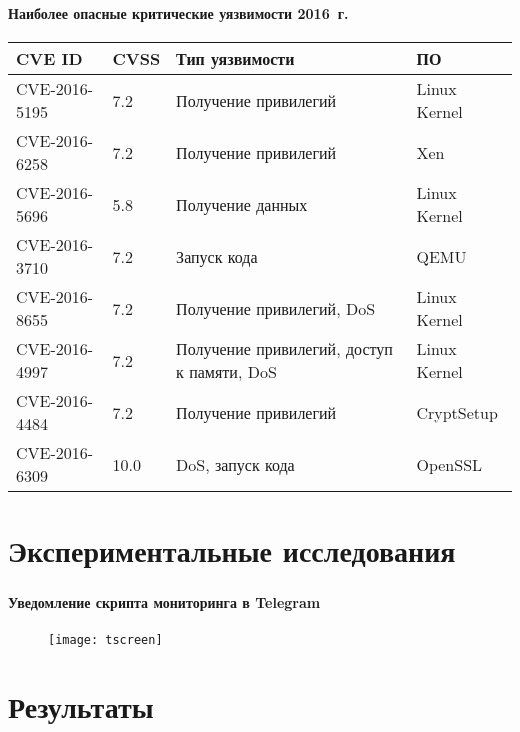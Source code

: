 \begin{frame}
\frametitle{\insertsection}
\framesubtitle{Наиболее опасные критические уязвимости 2016~г.}

\begin{table}[H]
  \begin{tabular}{|l|p{0.8cm}|p{4cm}|l|}
  \hline \textbf{CVE ID} & \textbf{CVSS} & \textbf{Тип уязвимости} & \textbf{ПО} \\
  \hline CVE-2016-5195 & 7.2 & Получение привилегий & Linux Kernel \\
  \hline CVE-2016-6258 & 7.2 & Получение привилегий & Xen \\
  \hline CVE-2016-5696 & 5.8 & Получение данных & Linux Kernel \\
  \hline CVE-2016-3710 & 7.2 & Запуск кода & QEMU \\
  \hline CVE-2016-8655 & 7.2 & Получение привилегий, DoS & Linux Kernel \\
  \hline CVE-2016-4997 & 7.2 & Получение привилегий, доступ к памяти, DoS & Linux Kernel \\
  \hline CVE-2016-4484 & 7.2 & Получение привилегий & CryptSetup \\
  \hline CVE-2016-6309 & 10.0 & DoS, запуск кода & OpenSSL\\
  \hline
  \end{tabular}
\end{table}
\end{frame}


\section{Экспериментальные исследования}

\begin{frame}
\frametitle{\insertsection}
\framesubtitle{Уведомление скрипта мониторинга в Telegram}

\begin{figure}
    \center
    \texttt{[image: tscreen]}
\end{figure}
\end{frame}


\section{Результаты}

